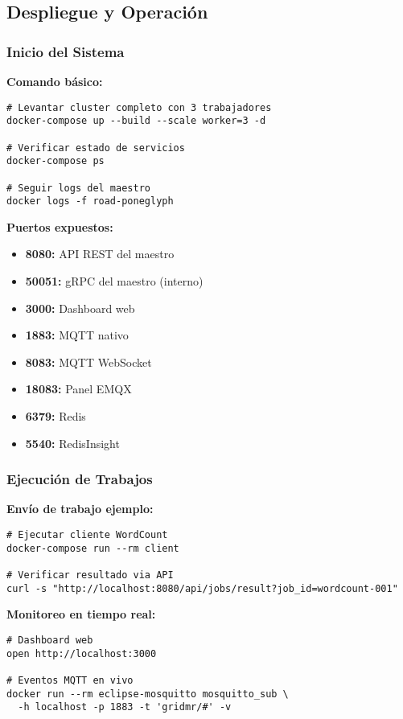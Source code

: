 \subsection{Despliegue y Operación}

\subsubsection{Inicio del Sistema}

\textbf{Comando básico:}
\begin{verbatim}
# Levantar cluster completo con 3 trabajadores
docker-compose up --build --scale worker=3 -d

# Verificar estado de servicios
docker-compose ps

# Seguir logs del maestro
docker logs -f road-poneglyph
\end{verbatim}

\textbf{Puertos expuestos:}
\begin{itemize}
    \item \textbf{8080:} API REST del maestro
    \item \textbf{50051:} gRPC del maestro (interno)
    \item \textbf{3000:} Dashboard web
    \item \textbf{1883:} MQTT nativo
    \item \textbf{8083:} MQTT WebSocket
    \item \textbf{18083:} Panel EMQX
    \item \textbf{6379:} Redis
    \item \textbf{5540:} RedisInsight
\end{itemize}

\subsubsection{Ejecución de Trabajos}

\textbf{Envío de trabajo ejemplo:}
\begin{verbatim}
# Ejecutar cliente WordCount
docker-compose run --rm client

# Verificar resultado via API
curl -s "http://localhost:8080/api/jobs/result?job_id=wordcount-001"
\end{verbatim}

\textbf{Monitoreo en tiempo real:}
\begin{verbatim}
# Dashboard web
open http://localhost:3000

# Eventos MQTT en vivo
docker run --rm eclipse-mosquitto mosquitto_sub \
  -h localhost -p 1883 -t 'gridmr/#' -v
\end{verbatim}

